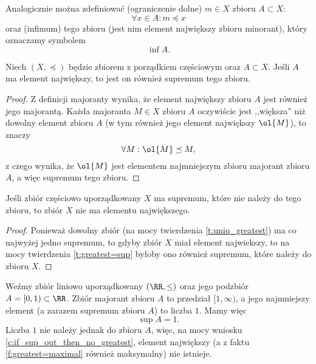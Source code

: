 \begin{remark}
    Analogicznie można zdefiniować  (ograniczenie dolne) $m \in X$ zbioru $A \subset X$:
    $$ \forall x \in A : m \preceq x $$
    oraz  (infimum) tego zbioru (jest nim element największy zbioru minorant), który oznaczamy symbolem $$\inf A.$$
\end{remark}

\begin{theorem}
    \label{t:greatest=sup}
    Niech $(X, \preceq)$ będzie zbiorem z porządkiem częściowym oraz $A \subset X$. Jeśli $A$ ma element największy, to jest on również supremum tego zbioru.
\end{theorem}
\begin{proof}
    Z definicji majoranty wynika, że element największy zbioru $A$ jest również jego majorantą. Każda majoranta $M \in X$ zbioru $A$ oczywiście jest ,,większa'' niż dowolny element zbioru $A$ (w tym również jego element największy $\ol{M}$), to znaczy
    $$ \forall M : \ol{M} \preceq M, $$
    z czego wynika, że $\ol{M}$ jest elementem najmniejszym zbioru majorant zbioru $A$, a więc supremum tego zbioru.
\end{proof}

\begin{corollary}
    \label{c:if_sup_out_then_no_greatest}
    Jeśli zbiór częściowo uporządkowany $X$ ma supremum, które nie należy do tego zbioru, to zbiór $X$ nie ma elementu największego.
\end{corollary}
\begin{proof}
    Ponieważ dowolny zbiór (na mocy twierdzenia \ref{t:uniq_greatest}) ma co najwyżej jedno supremum, to gdyby zbiór $X$ miał element najwiekszy, to na mocy twierdzenia \ref{t:greatest=sup} byłoby ono również supremum, które należy do zbioru $X$.
\end{proof}

\begin{example}
    Weźmy zbiór liniowo uporządkowany $(\RR, \leq)$ oraz jego podzbiór $A = [0, 1) \subset \RR$. Zbiór majorant zbioru $A$ to przedział $[1, \infty)$, a jego najmniejszy element (a zarazem supremum zbioru $A$) to liczba $1$. Mamy więc
    $$ \sup A = 1. $$
    Liczba $1$ nie należy jednak do zbioru $A$, więc, na mocy wniosku \ref{c:if_sup_out_then_no_greatest}, element największy (a z faktu \ref{f:greatest=maximal} również maksymalny) nie istnieje.
\end{example}

